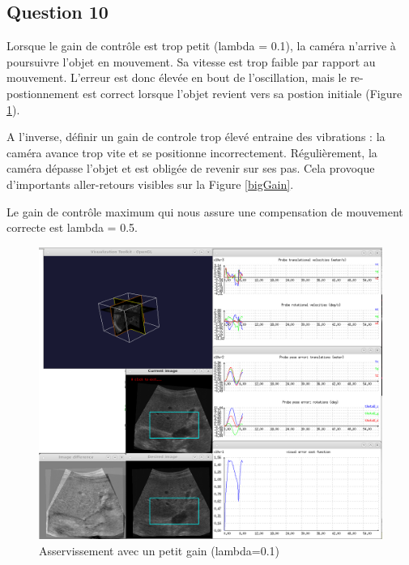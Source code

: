 \documentclass[a4paper,11pt]{article}
\begin{document}
\subsection{Question 10}
Lorsque le gain de contr\^ole est trop petit (lambda = 0.1), la cam\'era n'arrive \`a poursuivre l'objet en mouvement. Sa vitesse est trop faible par rapport au mouvement. L'erreur est donc \'elev\'ee en bout de l'oscillation, mais le re-postionnement est correct lorsque l'objet revient vers sa postion initiale (Figure \ref{smallGain}).
\par
A l'inverse, d\'efinir un gain de controle trop \'elev\'e entraine des vibrations : la cam\'era avance trop vite et se positionne incorrectement. R\'eguli\`erement, la cam\'era d\'epasse l'objet et est oblig\'ee de revenir sur ses pas. Cela provoque d'importants aller-retours visibles sur la Figure \ref{bigGain}.
\par
Le gain de contr\^ole maximum qui nous assure une compensation de mouvement correcte est lambda = 0.5.
\begin{figure}[H]
    \centering
    \includegraphics[width=0.5\textheight]{./images/q10_small.png}
    \caption{Asservissement avec un petit gain (lambda=0.1)}
    \label{smallGain}
\end{figure}
\end{document}
